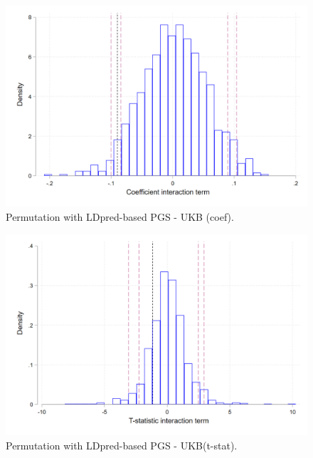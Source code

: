 \documentclass{article}
\begin{document}
\begin{figure}[H]
\centering 
\includegraphics[width=1\linewidth]{../figures/permutation_coef_ukb.png}
\caption{Permutation with LDpred-based PGS - UKB (coef).}
\end{figure}

\begin{figure}[H]
\centering 
\includegraphics[width=1\linewidth]{../figures/permutation_tstat_ukb.png}
\caption{Permutation with LDpred-based PGS - UKB(t-stat).}
\end{figure}
\end{document}
